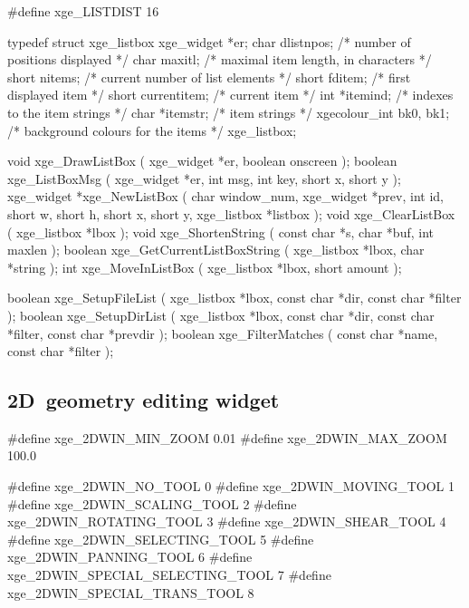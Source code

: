 \begin{listingC}
#define xge_LISTDIST 16

typedef struct xge_listbox {
    xge_widget   *er;
    char          dlistnpos;   /* number of positions displayed */
    char          maxitl;      /* maximal item length, in characters */
    short         nitems;      /* current number of list elements */
    short         fditem;      /* first displayed item */
    short         currentitem; /* current item */
    int           *itemind;    /* indexes to the item strings */
    char          *itemstr;    /* item strings */
    xgecolour_int bk0, bk1;    /* background colours for the items */
  } xge_listbox;

void xge_DrawListBox ( xge_widget *er, boolean onscreen );
boolean xge_ListBoxMsg ( xge_widget *er,
                         int msg, int key, short x, short y );
xge_widget *xge_NewListBox ( char window_num, xge_widget *prev,
                             int id,
                             short w, short h, short x, short y,
                             xge_listbox *listbox );
void xge_ClearListBox ( xge_listbox *lbox );
void xge_ShortenString ( const char *s, char *buf, int maxlen );
boolean xge_GetCurrentListBoxString ( xge_listbox *lbox,
                                      char *string );
int xge_MoveInListBox ( xge_listbox *lbox, short amount );
\end{listingC}

\begin{listingC}
boolean xge_SetupFileList ( xge_listbox *lbox, const char *dir,
                            const char *filter );
boolean xge_SetupDirList ( xge_listbox *lbox, const char *dir,
                           const char *filter, const char *prevdir );
boolean xge_FilterMatches ( const char *name, const char *filter );
\end{listingC}


\newpage
\subsection{2D~geometry editing widget}

\begin{listingC}
#define xge_2DWIN_MIN_ZOOM             0.01
#define xge_2DWIN_MAX_ZOOM           100.0

#define xge_2DWIN_NO_TOOL                0
#define xge_2DWIN_MOVING_TOOL            1
#define xge_2DWIN_SCALING_TOOL           2
#define xge_2DWIN_ROTATING_TOOL          3
#define xge_2DWIN_SHEAR_TOOL             4
#define xge_2DWIN_SELECTING_TOOL         5
#define xge_2DWIN_PANNING_TOOL           6
#define xge_2DWIN_SPECIAL_SELECTING_TOOL 7
#define xge_2DWIN_SPECIAL_TRANS_TOOL     8
\end{listingC}

